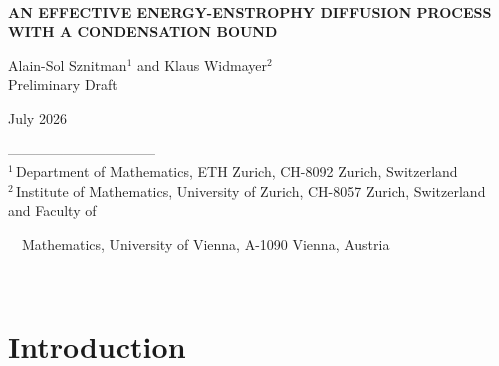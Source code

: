 \documentclass[12pt,leqno]{article}
\def\IR{{\mathbb R}}
\begin{document}
\noindent
~


\bigskip
\begin{center}
{\bf AN EFFECTIVE ENERGY-ENSTROPHY DIFFUSION PROCESS \\ WITH A CONDENSATION BOUND}
\end{center}


\begin{center}
Alain-Sol Sznitman$^1$ and Klaus Widmayer$^2$
\\[2ex]
Preliminary Draft
\end{center}

\begin{abstract}
We use Gaussian measure on $\IR^N$ to define the coefficients of an elliptic diffusion and show that it lives in an open cone of $\IR^2$. One component represents enstrophy and the other energy. We establish the existence and uniqueness of a stationary distribution for this diffusion. Owing to the special properties of the coefficients of this diffusion, we derive a condensation bound, which controls the distance to $1$ of the ratio of the expected energy to the expected enstrophy (this ratio is at most  $1$ with our normalization). In a companion article, as a ``proof of concept'', we show that the diffusion constructed in this work is the inviscid limit of the laws of the ``enstrophy-energy'' process of a stationary $N$-dimensional Galerkin-Navier-Stokes type evolution with Brownian forcing and random stirring (the strength of which can be made to go to zero in the inviscid limit, and which plays the role of a regularization).


\end{abstract}

\vfill
\hfill July 2026
\vfill
\noindent
{\footnotesize
-------------------------------- \\
$^1\,$Department of Mathematics, ETH Zurich, CH-8092 Zurich, Switzerland\\
$^2\,$Institute of Mathematics, University of Zurich, CH-8057 Zurich, Switzerland and Faculty of 

\vspace{-0.5ex}
\noindent
~~\!Mathematics, University of Vienna, A-1090 Vienna, Austria
}


\newpage
\thispagestyle{empty}
~


\newpage
\setcounter{page}{1}

\setcounter{section}{-1}
\section{Introduction}
\end{document}
